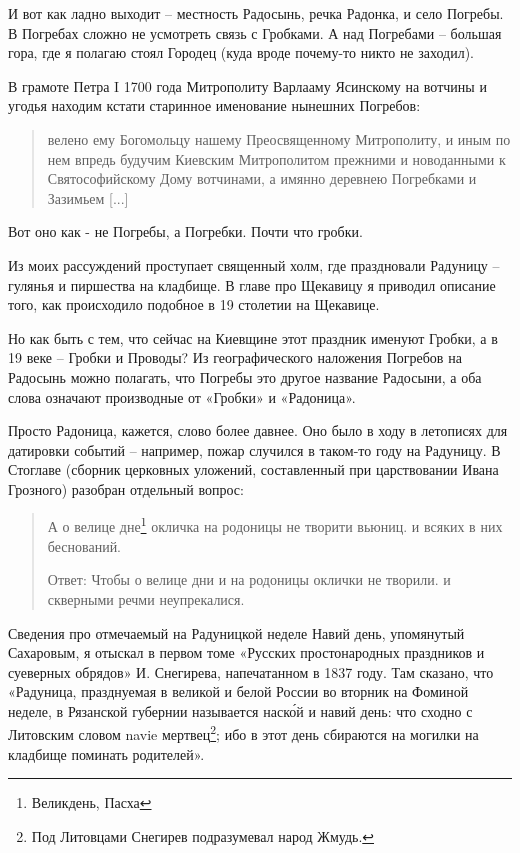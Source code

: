 И вот как ладно выходит – местность Радосынь, речка Радонка, и село Погребы. В Погребах сложно не усмотреть связь с Гробками. А над Погребами – большая гора, где я полагаю стоял Городец (куда вроде почему-то никто не заходил).

В грамоте Петра I 1700 года Митрополиту Варлааму Ясинскому на вотчины и угодья находим кстати старинное именование нынешних Погребов:

\begin{quotation}
велено ему Богомольцу нашему Преосвященному Митрополиту, и иным по нем впредь будучим Киевским Митрополитом прежними и новоданными к Святософийскому Дому вотчинами, а имянно деревнею Погребками и Зазимьем [...]
\end{quotation}

Вот оно как - не Погребы, а Погребки. Почти что гробки.

Из моих рассуждений проступает священный холм, где праздновали Радуницу – гулянья и пиршества на кладбище. В главе про Щекавицу я приводил описание того, как происходило подобное в 19 столетии на Щекавице.

Но как быть с тем, что сейчас на Киевщине этот праздник именуют Гробки, а в 19 веке – Гробки и Проводы? Из географического наложения Погребов на Радосынь можно полагать, что Погребы это другое название Радосыни, а оба слова означают производные от «Гробки» и «Радоница».

Просто Радоница, кажется, слово более давнее. Оно было в ходу в летописях для датировки событий – например, пожар случился в таком-то году на Радуницу. В Стоглаве (сборник церковных уложений, составленный при царствовании Ивана Грозного) разобран отдельный вопрос:

\begin{quotation}
А о велице дне\footnote{Великдень, Пасха} окличка на родоницы не творити вьюниц. и всяких в них беснований.

Ответ: Чтобы о велице дни и на родоницы оклички не творили. и скверными речми неупрекалися.
\end{quotation}

Сведения про отмечаемый на Радуницкой неделе Навий день, упомянутый Сахаровым, я отыскал в первом томе «Русских простонародных праздников и суеверных обрядов» И. Снегирева, напечатанном в 1837 году. Там сказано, что «Радуница, празднуемая в великой и белой России во вторник на Фоминой неделе, в Рязанской губернии называется наск\'ой и навий день: что сходно с Литовским словом navie мертвец\footnote{Под Литовцами Снегирев подразумевал народ Жмудь.}; ибо в этот день сбираются на могилки на кладбище поминать родителей».

